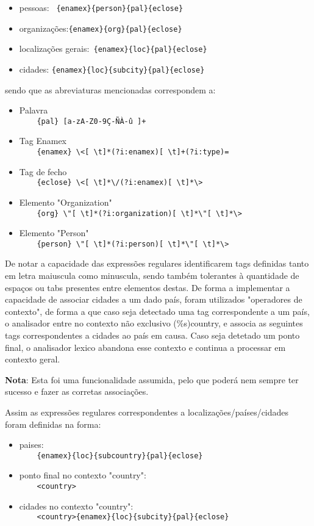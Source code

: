 \begin{itemize}
\item pessoas: \verb! {enamex}{person}{pal}{eclose}! 
\item organizações:\verb!{enamex}{org}{pal}{eclose}!
\item localizações gerais:\verb! {enamex}{loc}{pal}{eclose}!
\item cidades: \verb!{enamex}{loc}{subcity}{pal}{eclose}!
\end{itemize}

sendo que as abreviaturas mencionadas correspondem a:

\begin{itemize}
\item Palavra \\
	\verb!    {pal} [a-zA-Z0-9Ç-ÑÀ-û ]+!
\item Tag Enamex \\
	\verb!    {enamex} \<[ \t]*(?i:enamex)[ \t]+(?i:type)=!
\item Tag de fecho \\
	\verb!    {eclose} \<[ \t]*\/(?i:enamex)[ \t]*\>!
\item Elemento "Organization"\\
	\verb!    {org} \"[ \t]*(?i:organization)[ \t]*\"[ \t]*\>!
\item Elemento "Person"\\
	\verb!    {person} \"[ \t]*(?i:person)[ \t]*\"[ \t]*\>!
\end{itemize}


De notar a capacidade das expressões regulares identificarem tags definidas tanto em letra maiuscula como minuscula, sendo também tolerantes à quantidade de espaços ou tabs presentes entre elementos destas.
De forma a implementar a capacidade de associar cidades a um dado país, foram utilizados "operadores de contexto", de forma a que caso seja detectado uma tag correspondente a um país, o analisador entre no contexto não exclusivo (\%s)country, e associa as seguintes tags correspondentes a cidades ao país em causa. Caso seja detetado um ponto final, o analisador lexico abandona esse contexto e continua a processar em contexto geral. 

\textbf{Nota}: Esta foi uma funcionalidade assumida, pelo que poderá nem sempre ter sucesso e fazer as corretas associações.

Assim as expressões regulares correspondentes a localizações/países/cidades foram definidas na forma:

\begin{itemize}
\item paises: \\
	\verb!    {enamex}{loc}{subcountry}{pal}{eclose}!
\item ponto final no contexto "country":\\
	\verb!    <country>!
\item cidades no contexto "country":\\
	\verb!    <country>{enamex}{loc}{subcity}{pal}{eclose}!
\end{itemize}

